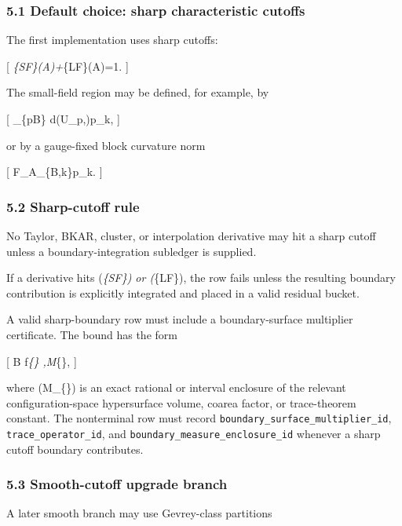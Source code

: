 \documentclass[
]{article}
\begin{document}
\subsubsection{5.1 Default choice: sharp characteristic
cutoffs}\label{default-choice-sharp-characteristic-cutoffs}

The first implementation uses sharp cutoffs:

{[} \chi\emph{\{\rm SF\}(A)+\chi}\{\rm LF\}(A)=1. {]}

The small-field region may be defined, for example, by

{[} \max\_\{p\subset B\} d(U\_p,)\le p\_k, {]}

or by a gauge-fixed block curvature norm

{[} \textbar F\_A\textbar\_\{B,k\}\le p\_k. {]}

\subsubsection{5.2 Sharp-cutoff rule}\label{sharp-cutoff-rule}

No Taylor, BKAR, cluster, or interpolation derivative may hit a sharp
cutoff unless a boundary-integration subledger is supplied.

If a derivative hits (\chi\emph{\{\rm SF\}) or (\chi}\{\rm LF\}), the
row fails unless the resulting boundary contribution is explicitly
integrated and placed in a valid residual bucket.

A valid sharp-boundary row must include a boundary-surface multiplier
certificate. The bound has the form

{[} \textbar{}\mathcal B\textbar{} \le
\textbar f\textbar{}\emph{\{\infty\} ,M}\{\}, {]}

where (M\_\{\}) is an exact rational or interval
enclosure of the relevant configuration-space hypersurface volume,
coarea factor, or trace-theorem constant. The nonterminal row must
record \texttt{boundary\_surface\_multiplier\_id},
\texttt{trace\_operator\_id}, and
\texttt{boundary\_measure\_enclosure\_id} whenever a sharp cutoff
boundary contributes.

\subsubsection{5.3 Smooth-cutoff upgrade
branch}\label{smooth-cutoff-upgrade-branch}

A later smooth branch may use Gevrey-class partitions
\end{document}
